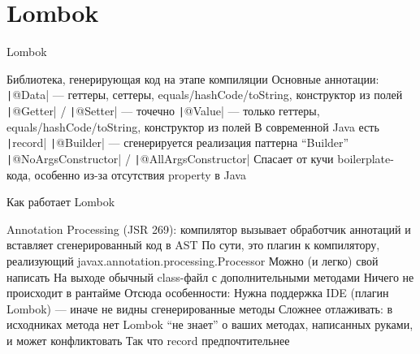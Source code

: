 \documentclass{../../slides-style}
\begin{document}
    \section{Lombok}

    \begin{frame}{Lombok}
        \begin{outline}
            \1 Библиотека, генерирующая код на этапе компиляции
            \1 Основные аннотации:
                \2 \texttt|@Data| --- геттеры, сеттеры, equals/hashCode/toString, конструктор из полей
                \2 \texttt|@Getter| / \texttt|@Setter| --- точечно
                \2 \texttt|@Value| --- только геттеры, equals/hashCode/toString, конструктор из полей
                    \3 В современной Java есть \texttt|record|
                \2 \texttt|@Builder| --- сгенерируется реализация паттерна \enquote{Builder}
                \2 \texttt|@NoArgsConstructor| / \texttt|@AllArgsConstructor|
            \1 Спасает от кучи boilerplate-кода, особенно из-за отсутствия property в Java
        \end{outline}
    \end{frame}

    \begin{frame}{Как работает Lombok}
        \begin{outline}
            \1 Annotation Processing (JSR 269): компилятор вызывает обработчик аннотаций и вставляет сгенерированный код в AST
                \2 По сути, это плагин к компилятору, реализующий javax.annotation.processing.Processor
                    \3 Можно (и легко) свой написать
            \1 На выходе обычный class-файл с дополнительными методами
                \2 Ничего не происходит в рантайме
            \1 Отсюда особенности:
                \2 Нужна поддержка IDE (плагин Lombok) --- иначе не видны сгенерированные методы
                \2 Сложнее отлаживать: в исходниках метода нет
                \2 Lombok \enquote{не знает} о ваших методах, написанных руками, и может конфликтовать
                \2 Так что record предпочтительнее
        \end{outline}
    \end{frame}
\end{document}
